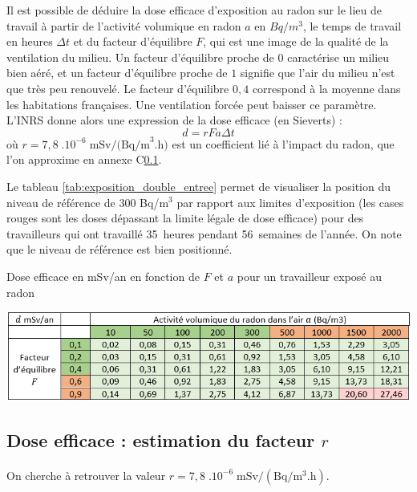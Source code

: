 \documentclass{article}
\begin{document}
Il est possible de déduire la dose efficace d’exposition au radon sur le lieu de travail à partir de l’activité volumique en radon $a$ en $Bq/m^3$, le temps de travail en heures $\Delta t$ et du facteur d’équilibre $F$, qui est une image de la qualité de la ventilation du milieu. Un facteur d’équilibre proche de $0$ caractérise un milieu bien aéré, et un facteur d’équilibre proche de $1$ signifie que l’air du milieu n’est que très peu renouvelé. Le facteur d’équilibre $0,4$ correspond à la moyenne dans les habitations françaises. Une ventilation forcée peut baisser ce paramètre. L'INRS donne alors une expression \cite{blanchardon_evaluation_2019} de la dose efficace (en Sieverts) : $$
d = r F a \Delta t
$$
où $r=7,8 \; .10^{-6} \; \text{mSv/(Bq/m}^3\text{.h})$ est un coefficient lié à l’impact du radon, que l'on approxime en annexe C\ref{annexe:estimation_r}. %

Le tableau \ref{tab:exposition_double_entree} permet de visualiser la position du niveau de référence de 300 Bq/m$^3$ par rapport aux limites d’exposition (les cases rouges sont les doses dépassant la limite légale de dose efficace) pour des travailleurs qui ont travaillé 35~heures pendant 56~semaines de l’année. On note que le niveau de référence est bien positionné.

\begin{table}[H]
    \centering
    \caption{Dose efficace en mSv/an en fonction de $F$ et $a$ pour un travailleur exposé au radon}
    \includegraphics[width=\linewidth]{II_A2_6.png}
    \label{tab:exposition_double_entree}
\end{table}

\subsection{Dose efficace : estimation du facteur $r$}
\label{annexe:estimation_r}

\paragraph{} On cherche à retrouver la valeur $r=7,8 \; .10^{-6} \;\text{mSv}/(\text{Bq}/\text{m}^3.\text{h})$.
\end{document}
